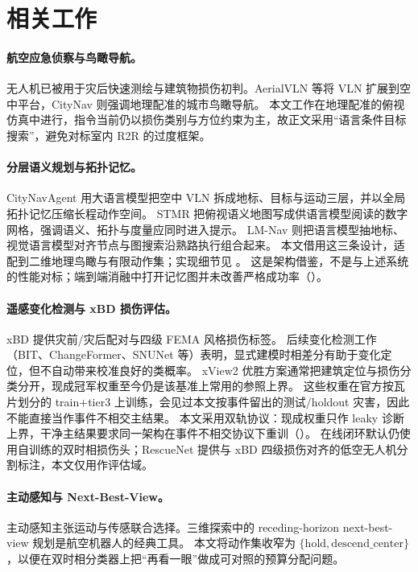 \section{相关工作}
\label{sec:related}

\paragraph{航空应急侦察与鸟瞰导航。}
无人机已被用于灾后快速测绘与建筑物损伤初判。AerialVLN 等将 VLN 扩展到空中平台\cite{liu2023aerialvln}，CityNav 则强调地理配准的城市鸟瞰导航\cite{lee2025citynav}。
本文工作在地理配准的俯视仿真中进行，指令当前仍以损伤类别与方位约束为主，故正文采用``语言条件目标搜索''，避免对标室内 R2R 的过度框架。

\paragraph{分层语义规划与拓扑记忆。}
CityNavAgent 用大语言模型把空中 VLN 拆成地标、目标与运动三层，并以全局拓扑记忆压缩长程动作空间\cite{zhang2025citynavagent}。
STMR 把俯视语义地图写成供语言模型阅读的数字网格，强调语义、拓扑与度量应同时进入提示\cite{gao2024stmr}。
LM-Nav 则把语言模型抽地标、视觉语言模型对齐节点与图搜索沿熟路执行组合起来\cite{shah2023lmnav}。
本文借用这三条设计，适配到二维地理鸟瞰与有限动作集；实现细节见 。
这是架构借鉴，不是与上述系统的性能对标；端到端消融中打开记忆图并未改善严格成功率（）。

\paragraph{遥感变化检测与 xBD 损伤评估。}
xBD 提供灾前/灾后配对与四级 FEMA 风格损伤标签\cite{gupta2019xbd}。
后续变化检测工作（BIT、ChangeFormer、SNUNet 等）表明，显式建模时相差分有助于变化定位，但不自动带来校准良好的类概率\cite{chen2022bit,bandara2022changeformer,fang2022snunet}。
xView2 优胜方案通常把建筑定位与损伤分类分开，现成冠军权重至今仍是该基准上常用的参照上界。
这些权重在官方按瓦片划分的 train+tier3 上训练，会见过本文按事件留出的测试/holdout 灾害，因此不能直接当作事件不相交主结果。
本文采用双轨协议：现成权重只作 leaky 诊断上界，干净主结果要求同一架构在事件不相交协议下重训（）。
在线闭环默认仍使用自训练的双时相损伤头；RescueNet 提供与 xBD 四级损伤对齐的低空无人机分割标注\cite{rahnemoonfar2023rescuenet}，本文仅用作评估域。

\paragraph{主动感知与 Next-Best-View。}
主动感知主张运动与传感联合选择\cite{bajcsy1988active}。三维探索中的 receding-horizon next-best-view 规划是航空机器人的经典工具\cite{bircher2016nbv}。
本文将动作集收窄为 $\{\mathrm{hold},\mathrm{descend\_center}\}$，以便在双时相分类器上把``再看一眼''做成可对照的预算分配问题。

